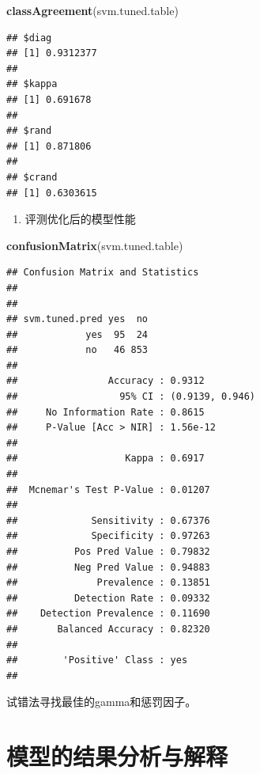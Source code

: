 \documentclass[
]{article}
\newenvironment{Shaded}{\begin{snugshade}}{\end{snugshade}}
\newcommand{\KeywordTok}[1]{\textcolor[rgb]{0.13,0.29,0.53}{\textbf{#1}}}
\newcommand{\NormalTok}[1]{#1}
\providecommand{\tightlist}{%
  \setlength{\itemsep}{0pt}\setlength{\parskip}{0pt}}
\begin{document}
\begin{Shaded}
\begin{Highlighting}[]
\KeywordTok{classAgreement}\NormalTok{(svm.tuned.table)}
\end{Highlighting}
\end{Shaded}

\begin{verbatim}
## $diag
## [1] 0.9312377
## 
## $kappa
## [1] 0.691678
## 
## $rand
## [1] 0.871806
## 
## $crand
## [1] 0.6303615
\end{verbatim}

\begin{enumerate}
\def\labelenumi{\arabic{enumi}.}
\setcounter{enumi}{6}
\tightlist
\item
  评测优化后的模型性能
\end{enumerate}

\begin{Shaded}
\begin{Highlighting}[]
\KeywordTok{confusionMatrix}\NormalTok{(svm.tuned.table)}
\end{Highlighting}
\end{Shaded}

\begin{verbatim}
## Confusion Matrix and Statistics
## 
##               
## svm.tuned.pred yes  no
##            yes  95  24
##            no   46 853
##                                          
##                Accuracy : 0.9312         
##                  95% CI : (0.9139, 0.946)
##     No Information Rate : 0.8615         
##     P-Value [Acc > NIR] : 1.56e-12       
##                                          
##                   Kappa : 0.6917         
##                                          
##  Mcnemar's Test P-Value : 0.01207        
##                                          
##             Sensitivity : 0.67376        
##             Specificity : 0.97263        
##          Pos Pred Value : 0.79832        
##          Neg Pred Value : 0.94883        
##              Prevalence : 0.13851        
##          Detection Rate : 0.09332        
##    Detection Prevalence : 0.11690        
##       Balanced Accuracy : 0.82320        
##                                          
##        'Positive' Class : yes            
## 
\end{verbatim}

试错法寻找最佳的gamma和惩罚因子。

\hypertarget{ux6a21ux578bux7684ux7ed3ux679cux5206ux6790ux4e0eux89e3ux91ca}{%
\section{模型的结果分析与解释}\label{ux6a21ux578bux7684ux7ed3ux679cux5206ux6790ux4e0eux89e3ux91ca}}
\end{document}
